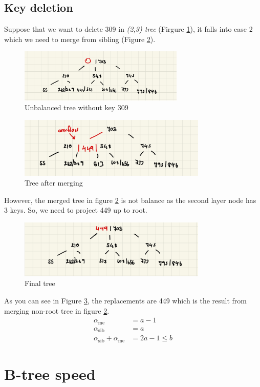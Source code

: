 \documentclass[a4paper, 12pt]{report}
\begin{document}
\section{Key deletion}

\noindent Suppose that we want to delete 309 in \emph{(2,3) tree} (Firgure \ref{fig:tree-deletion-1}), it falls into case 2 which 
we need to merge from sibling (Figure \ref{fig:tree-deletion-2}).

\begin{figure}[h]
        \centering
        \includegraphics[width=0.7\textwidth,scale=0.5]{tree_deletion_1.jpeg}
        \caption{\label{fig:tree-deletion-1} Unbalanced tree without key 309}
\end{figure}

\begin{figure}[h]
        \centering
        \includegraphics[width=0.8\textwidth,scale=0.5]{tree_deletion_2.jpeg}
        \caption{\label{fig:tree-deletion-2} Tree after merging}
\end{figure}

However, the merged tree in figure \ref{fig:tree-deletion-2} is not balance as the second layer node has 3 keys. So, we need to project 449 up to root.

\begin{figure}[h]
        \centering
        \includegraphics[width=0.8\textwidth,scale=0.5]{tree_deletion_3.jpeg}
        \caption{\label{fig:tree-deletion-3} Final tree}
\end{figure}


As you can see in Figure \ref{fig:tree-deletion-3}, the replacements are 449 which is the result from merging 
non-root tree in figure \ref{fig:tree-deletion-2}.
\begin{align*}
        \alpha_{\text{me}} &= a - 1 \\
        \alpha_{\text{sib}} &= a \\
        \alpha_{\text{sib}} + \alpha_{\text{me}} &= 2a - 1 \leq b
\end{align*} 


\chapter{B-tree speed}
\end{document}
